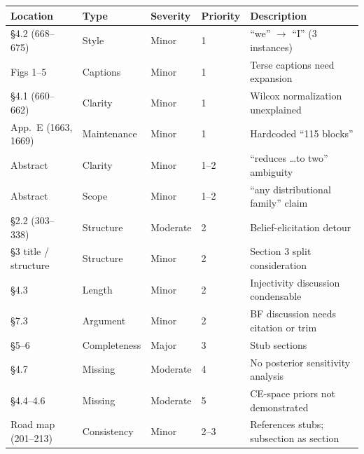 \documentclass[12pt,a4paper]{article}
\begin{document}
\begin{center}
\small
\begin{tabular}{lllll}
\toprule
Location & Type & Severity & Priority & Description \\
\midrule
\S4.2 (668--675) & Style & Minor & 1 & ``we'' $\to$ ``I'' (3 instances) \\
Figs 1--5 & Captions & Minor & 1 & Terse captions need expansion \\
\S4.1 (660--662) & Clarity & Minor & 1 & Wilcox normalization unexplained \\
App.\ E (1663, 1669) & Maintenance & Minor & 1 & Hardcoded ``115 blocks'' \\
Abstract & Clarity & Minor & 1--2 & ``reduces \ldots to two'' ambiguity \\
Abstract & Scope & Minor & 1--2 & ``any distributional family'' claim \\
\S2.2 (303--338) & Structure & Moderate & 2 & Belief-elicitation detour \\
\S3 title / structure & Structure & Minor & 2 & Section 3 split consideration \\
\S4.3 & Length & Minor & 2 & Injectivity discussion condensable \\
\S7.3 & Argument & Minor & 2 & BF discussion needs citation or trim \\
\S5--6 & Completeness & Major & 3 & Stub sections \\
\S4.7 & Missing & Moderate & 4 & No posterior sensitivity analysis \\
\S4.4--4.6 & Missing & Moderate & 5 & CE-space priors not demonstrated \\
Road map (201--213) & Consistency & Minor & 2--3 & References stubs; subsection as section \\
\bottomrule
\end{tabular}
\end{center}
\end{document}
